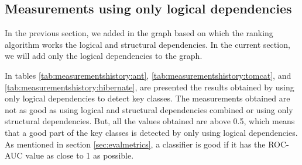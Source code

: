 \documentclass[12pt, a4paper, twoside]{report}
\begin{document}
\begin{table}[!h]
\renewcommand{\arraystretch}{1}
\caption{Measurements for Hibernate using structural and logical dependencies combined}
\label{tab:measurementscombined:hibernate}
\centering
{}
\end{table}





\subsection{Measurements using only logical dependencies}
In the previous section, we added in the graph based on which the ranking algorithm works the logical and structural dependencies. In the current section, we will add only the logical dependencies to the graph.

In tables \ref{tab:measurementshistory:ant}, \ref{tab:measurementshistory:tomcat}, and \ref{tab:measurementshistory:hibernate}, are presented the results obtained by using only logical dependencies to detect key classes. The measurements obtained are not as good as using logical and structural dependencies combined or using only structural dependencies. But, all the values obtained are above 0.5, which means that a good part of the key classes is detected by only using logical dependencies.  As mentioned in section \ref{sec:evalmetrics}, a classifier is good if it has the ROC-AUC value as close to 1 as possible. 
\end{document}
